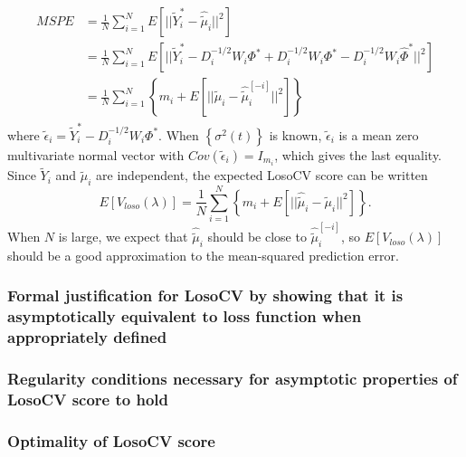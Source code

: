 \documentclass[12pt]{article}
\newcommand{\tildeY}{\tilde{Y}}
\theoremstyle{definition}
\begin{document}
\begin{align}
\begin{split}\label{eq:MSPE}
MSPE &= \frac{1}{N}\sum_{i=1}^N E\left[ \vert \vert \tildeY^*_i - \widehat{\tilde{\mu}}_{i} \vert \vert^2 \right]\\
&=  \frac{1}{N}\sum_{i=1}^N E\left[ \vert \vert \tildeY^*_i - D_i^{-1/2}W_i \Phi^* + D_i^{-1/2}W_i \Phi^* - D_i^{-1/2}W_i \hat{\Phi}^*\vert \vert^2 \right]\\
&=  \frac{1}{N}\sum_{i=1}^N \left\{m_i + E\left[ \vert \vert \tilde{\mu}_{i} - \widehat{\tilde{\mu}}^{\left[ -i \right]}_{i} \vert \vert^2 \right] \right\}
\end{split}
\end{align}
\noindent
where $\tilde{\epsilon}_i = \tildeY^*_i - D_i^{-1/2}W_i \Phi^*$. When $\left\{ \sigma^2\left(t\right)\right\}$ is known, $\tilde{\epsilon}_i$ is a mean zero multivariate normal vector with $Cov\left(\tilde{\epsilon}_i\right) = I_{m_i}$, which gives the last equality. Since $\tildeY_i$ and $ \widehat{\tilde{\mu}}_{i} $ are independent, the expected LosoCV score can be written
\begin{equation} \label{eq:MSPE_LOSOCV}
E\left[V_{loso}\left(\lambda\right) \right] =  \frac{1}{N}\sum_{i=1}^N\left\{ m_i +  E\left[ \vert \vert \widehat{\tilde{\mu}}_{i} - \tilde{\mu}_{i} \vert \vert^2 \right] \right\}. 
\end{equation}
\noindent
When $N$ is large, we expect that $\widehat{\tilde{\mu}}_{i}$ should be close to $\widehat{\tilde{\mu}}^{\left[ -i \right]}_{i}$, so $E\left[V_{loso}\left(\lambda\right) \right]$ should be a good approximation to the mean-squared prediction error. 
 
 \subsubsection{Formal justification for LosoCV by showing that it is asymptotically equivalent to loss function when appropriately defined}
 
 
 \subsubsection{Regularity conditions necessary for asymptotic properties of LosoCV score to hold} 
 
 \subsubsection{Optimality of LosoCV score}
 
\end{document}
